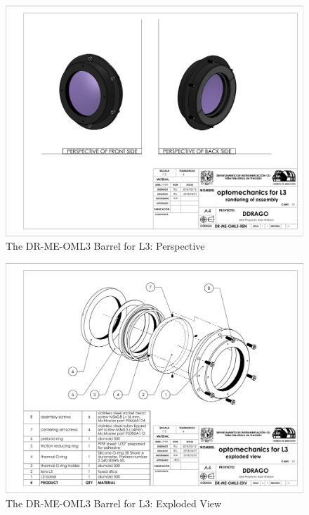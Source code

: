 \documentclass{article}
\begin{document}
\begin{figure}
\begin{center}
\includegraphics[height=\linewidth,angle=90]{figures/DR-ME-OML3-REN}
\end{center}
\caption{The DR-ME-OML3 Barrel for L3: Perspective}
\label{figure:rosalia-oml3-perspective}
\end{figure}

\begin{figure}
\begin{center}
\includegraphics[height=\linewidth,angle=90]{figures/DR-ME-OML3-EXV}
\end{center}
\caption{The DR-ME-OML3 Barrel for L3: Exploded View}
\label{figure:rosalia-oml3-exploded}
\end{figure}
\end{document}
